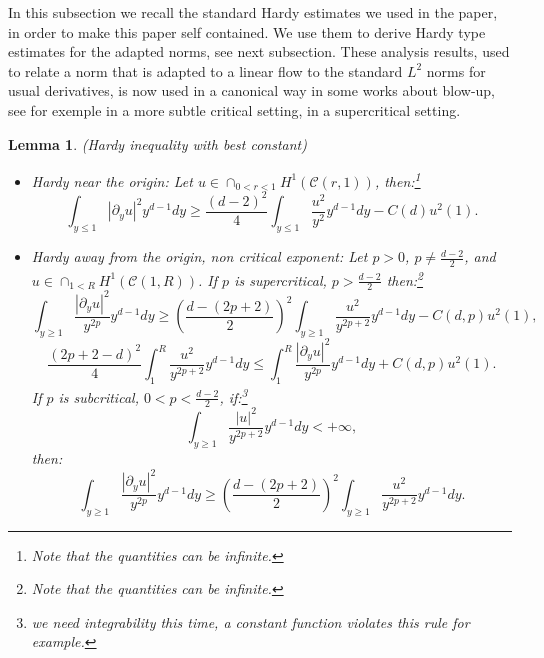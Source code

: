 \documentclass[11pt,a4paper,reqno]{amsart}
\newtheorem{lemma}[theorem]{Lemma}
\theoremstyle{remark}
\numberwithin{equation}{section}
\begin{document}
\begin{appendix}
In this subsection we recall the standard Hardy estimates we used in the paper, in order to make this paper self contained. We use them to derive Hardy type estimates for the adapted norms, see next subsection. These analysis results, used to relate a norm that is adapted to a linear flow to the standard $L^2$ norms for usual derivatives, is now used in a canonical way in some works about blow-up, see  for exemple \cite{Rsc3} in a more subtle critical setting, \cite{MRRod2} in a supercritical setting.
\begin{lemma}\emph{(Hardy inequality with best constant)}\label{lemme:annexe:hardy1}
\begin{itemize}
\item[(i)]\emph{Hardy near the origin:} Let $u\in \cap_{0<r<1} H^1(\mathcal{C}(r,1))$, then:\footnote{Note that the quantities can be infinite.}
\begin{equation}
\int_{y\leq 1} |\partial_y u|^2y^{d-1}dy\geq \frac{(d-2)^2}{4}\int_{y\leq 1} \frac{u^2}{y^2}y^{d-1} dy -C(d) u^2(1) .
\end{equation}
\item[(ii)]\emph{Hardy away from the origin, non critical exponent:} Let $p>0$, $p\neq \frac{d-2}{2}$, and $u\in \cap_{1<R} H^1(\mathcal{C}(1,R))$. If $p$ is supercritical, $p>\frac{d-2}{2}$ then:\footnote{Note that the quantities can be infinite.}
\begin{equation}
\int_{y\geq 1} \frac{|\partial_y u|^2}{y^{2p}}y^{d-1}dy\geq \left( \frac{d-(2p+2)}{2}\right)^2 \int_{y\geq 1} \frac{u^2}{y^{2p+2}}y^{d-1}dy-C(d,p)u^2(1) ,
\end{equation}
\begin{equation} \label{annexe:hardy:identite surcritique}
\frac{(2p+2-d)^2}{4} \int_1^R \frac{u^2}{y^{2p+2}}y^{d-1}dy \leq \int_1^R \frac{|\partial_y u|^2}{y^{2p}}y^{d-1}dy +C(d,p)u^2(1).
\end{equation}
If $p$ is subcritical, $0<p<\frac{d-2}{2}$, if:\footnote{we need integrability this time, a constant function violates this rule for example.}
\begin{equation}\label{annexe:eq:condition d'inte A*}
\int_{y\geq 1} \frac{|u |^2}{y^{2p+2}}y^{d-1}dy <+\infty ,
\end{equation}
then:
\begin{equation}
\int_{y\geq 1} \frac{|\partial_y u|^2}{y^{2p}}y^{d-1}dy\geq \left( \frac{d-(2p+2)}{2}\right)^2 \int_{y\geq 1} \frac{u^2}{y^{2p+2}}y^{d-1}dy .
\end{equation}
\end{itemize}


\end{lemma}
\end{appendix}
\end{document}
